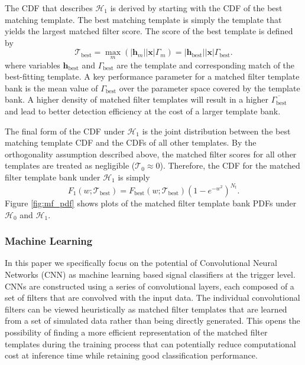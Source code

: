 The CDF that describes $\mathcal{H}_1$ is derived by starting with the CDF of the best matching template. The best matching template is simply the template that yields the largest matched filter score. The score of the best template is defined by
\begin{equation}
    \mathcal{T}_\mathrm{best}=\max_{m}\left(|\mathbf{h}_m||\mathbf{x}|\Gamma_{m}\right) = |\mathbf{h}_\mathrm{best}||\mathbf{x}|\Gamma_{\mathrm{best}}.
\end{equation}
where variables $\mathbf{h}_\mathrm{best}$ and $\Gamma_\mathrm{best}$ are the template and corresponding match of the best-fitting template. A key performance parameter for a matched filter template bank is the mean value of $\Gamma_\mathrm{best}$ over the parameter space covered by the template bank. A higher density of matched filter templates will result in a higher $\overline{\Gamma_\mathrm{best}}$ and lead to better detection efficiency at the cost of a larger template bank.

The final form of the CDF under $\mathcal{H}_1$ is the joint distribution between the best matching template CDF and the CDFs of all other templates. By the orthogonality assumption described above, the matched filter scores for all other templates are treated as negligible ($\mathcal{T}_\mathrm{0}\approx0$). Therefore, the CDF for the matched filter template bank under $\mathcal{H}_1$ is simply
\begin{equation}
    F_{1}(w;\mathcal{T}_\mathrm{best})=F_\mathrm{best}(w;\mathcal{T}_\mathrm{best})\left(1-e^{-w^2}\right)^{N_t}.
    \label{eq:cdf1_mf}
\end{equation}
Figure \ref{fig:mf_pdf} shows plots of the matched filter template bank PDFs under $\mathcal{H}_0$ and $\mathcal{H}_1$.

\subsubsection{Machine Learning}
In this paper we specifically focus on the potential of Convolutional Neural Networks (CNN) as machine learning based signal classifiers at the trigger level. CNNs are constructed using a series of convolutional layers, each composed of a set of filters that are convolved with the input data. The individual convolutional filters can be viewed heuristically as matched filter templates \cite{cnn_are_mf} that are learned from a set of simulated data rather than being directly generated. This opens the possibility of finding a more efficient representation of the matched filter templates during the training process that can potentially reduce computational cost at inference time while retaining good classification performance. 

